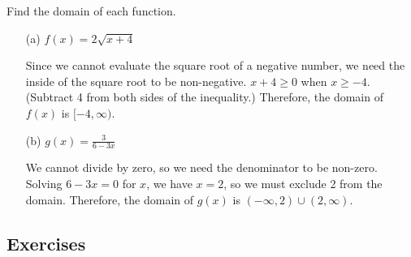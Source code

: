 \begin{example}
Find the domain of each function.
\begin{itemize}
    \item[(a)] $f(x) = 2\sqrt{x+4}$

    \solution Since we cannot evaluate the square root of a negative number, we need the inside of the square root to be non-negative. $x+4 \ge 0$ when $x \ge -4$. (Subtract 4 from both sides of the inequality.) Therefore, the domain of $f(x)$ is $[-4, \infty)$.
    \item[(b)] $g(x) = \frac{3}{6-3x}$

    \solution We cannot divide by zero, so we need the denominator to be non-zero. Solving $6-3x = 0$ for $x$, we have $x = 2$, so we must exclude 2 from the domain. Therefore, the domain of $g(x)$ is $(-\infty, 2)\cup(2, \infty)$.
\end{itemize}

\end{example}


\subsection{Exercises}
\label{1-2-exercises}

